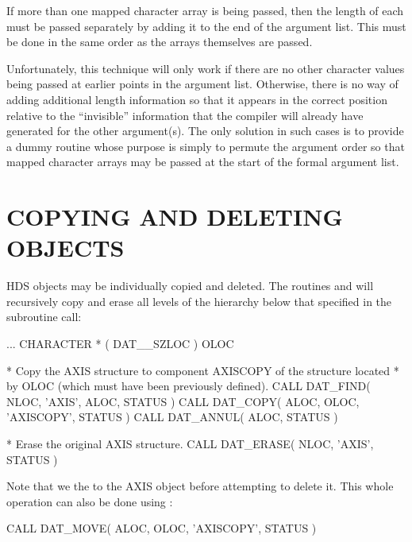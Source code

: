 \documentclass[twoside,11pt]{starlink}
\providecommand{\qt}[1]{``#1''}
\begin{document}
If more than one mapped character array is being passed, then the
length of each must be passed separately by adding it to the end of
the argument list.  This must be done in the same order as the arrays
themselves are passed.

Unfortunately, this technique will only work if there are no other
character values being passed at earlier points in the argument
list. Otherwise, there is no way of adding additional length
information so that it appears in the correct position relative to the
\qt{invisible} information that the compiler will already have
generated for the other argument(s). The only solution in such cases
is to provide a dummy routine whose purpose is simply to permute the
argument order so that mapped character arrays may be passed at the
start of the formal argument list.

\section{COPYING AND DELETING OBJECTS}

HDS objects may be individually copied and deleted.  The routines
 and  will
recursively copy and erase all levels of the hierarchy below that
specified in the subroutine call:

\begin{small}
\begin{terminalv}
      ...
      CHARACTER * ( DAT__SZLOC ) OLOC

*  Copy the AXIS structure to component AXISCOPY of the structure located
*  by OLOC (which must have been previously defined).
      CALL DAT_FIND( NLOC, 'AXIS', ALOC, STATUS )
      CALL DAT_COPY( ALOC, OLOC, 'AXISCOPY', STATUS )
      CALL DAT_ANNUL( ALOC, STATUS )

* Erase the original AXIS structure.
      CALL DAT_ERASE( NLOC, 'AXIS', STATUS )
\end{terminalv}
\end{small}

Note that we  the
 to the AXIS object before attempting
to delete it. This whole operation can also be done using
:

\begin{small}
\begin{terminalv}
CALL DAT_MOVE( ALOC, OLOC, 'AXISCOPY', STATUS )
\end{terminalv}
\end{small}
\end{document}
